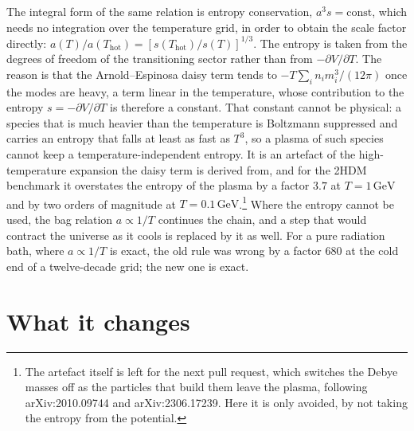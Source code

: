 \documentclass[11pt,a4paper]{article}
\renewcommand{\_}{\oldunderscore\allowbreak}
\begin{document}
The integral form of the same relation is entropy conservation, $a^3 s = \text{const}$, which
needs no integration over the temperature grid, in order to obtain the scale factor directly:
$a(T)/a(T_\text{hot}) = [s(T_\text{hot})/s(T)]^{1/3}$. The
entropy is taken from the degrees of freedom of the transitioning sector rather than from
$-\partial V/\partial T$. The reason is that the Arnold--Espinosa daisy term tends to
$-T \sum_i n_i m_i^3/(12\pi)$ once the modes are heavy, a term linear in the temperature, whose
contribution to the entropy $s = -\partial V/\partial T$ is therefore a constant. That constant
cannot be physical: a species that is much heavier than the temperature is Boltzmann
suppressed and carries an entropy that falls at least as fast as $T^3$, so a plasma of such
species cannot keep a temperature-independent entropy. It is an artefact of the
high-temperature expansion the daisy term is derived from, and for the 2HDM benchmark it
overstates the entropy of the plasma by a factor $3.7$ at $T = 1\,\text{GeV}$ and by two orders
of magnitude at $T = 0.1\,\text{GeV}$.\footnote{The artefact itself is left for the next pull
request, which switches the Debye masses off as the particles that build them leave the plasma,
following arXiv:2010.09744 and arXiv:2306.17239. Here it is only avoided, by not taking the
entropy from the potential.} Where the entropy cannot be used, the bag relation $a \propto 1/T$
continues the chain, and a step that would contract the universe as it cools is replaced by it
as well. For a pure radiation bath, where $a \propto 1/T$ is exact, the old rule was wrong by a
factor $680$ at the cold end of a twelve-decade grid; the new one is exact.

\section{What it changes}
\end{document}
